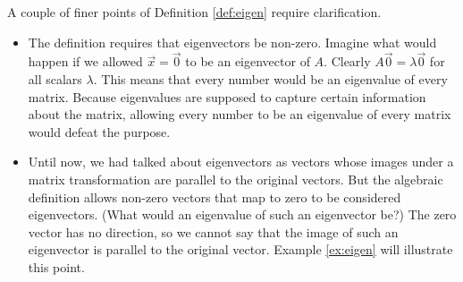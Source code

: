 \documentclass{ximera}
\begin{document}
\begin{observation}\label{obs:finerPointsOfEigDef}
A couple of finer points of Definition \ref{def:eigen} require clarification.
    \begin{itemize}
    \item The definition requires that eigenvectors be non-zero.  Imagine what would happen if we allowed $\vec{x}=\vec{0}$ to be an eigenvector of $A$. Clearly $A\vec{0}=\lambda\vec{0}$ for all scalars $\lambda$.  This means that every number would be an eigenvalue of every matrix.  Because eigenvalues are supposed to capture certain information about the matrix, allowing every number to be an eigenvalue of every matrix would defeat the purpose.
    \item Until now, we had talked about  eigenvectors as vectors whose images under a matrix transformation are parallel to the original vectors.  But the algebraic definition allows non-zero vectors that map to zero to be considered eigenvectors.  (What would an eigenvalue of such an eigenvector be?)  The zero vector has no direction, so we cannot say that the image of such an eigenvector is parallel to the original vector.  Example \ref{ex:eigen} will illustrate this point.
    \end{itemize}
\end{observation}
    
\end{document}

